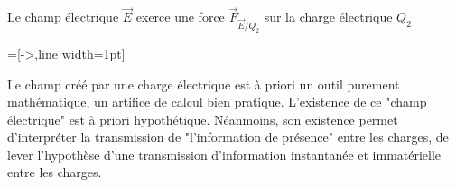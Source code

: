 Le champ électrique $\overrightarrow{E}$ exerce une force $\overrightarrow{F}_{\overrightarrow{E}/Q_2}$ sur la charge électrique $Q_2$

\begin{center}
=[->,line width=1pt]
\end{center}

Le champ créé par une charge électrique est à priori un outil purement mathématique, un artifice de calcul bien pratique. L'existence de ce "champ électrique" est à priori hypothétique. Néanmoins, son existence permet d'interpréter la transmission de "l'information de présence" entre les charges, de lever l'hypothèse d'une transmission d'information instantanée et immatérielle entre les charges.

